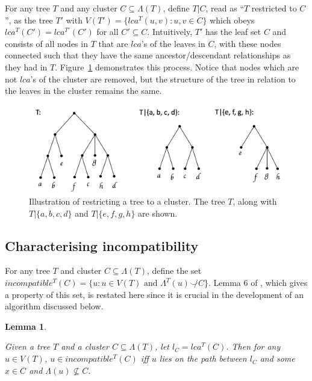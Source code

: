 \documentclass{article}
\newcommand{\compatible}{\smile}
\newcommand{\leafset}{\Lambda}
\newtheorem{incompatibility}{Lemma}
\begin{document}
    For any tree $T$ and any cluster $C \subseteq \leafset(T)$, define $T|C$, read as ``$T$ restricted to $C$'', as the tree $T'$ with $V(T') = \{lca^T(u, v) : u, v \in C\}$ which obeys $lca^T(C') = lca^{T'}(C')$ for all $C' \subseteq C$. Intuitively, $T'$ has the leaf set $C$ and consists of all nodes in $T$ that are $lca$'s of the leaves in $C$, with these nodes connected such that they have the same ancestor/descendant relationships as they had in $T$. Figure~\ref{fig:restrictedtree} demonstrates this process. Notice that nodes which are not $lca$'s of the cluster are removed, but the structure of the tree in relation to the leaves in the cluster remains the same.

    \begin{figure}[ht]
        \includegraphics[scale=0.5]{restrictedsubtree}
        \centering
        \caption[Restricted Trees]{Illustration of restricting a tree to a cluster. The tree $T$, along with $T|\{a, b, c, d\}$ and $T|\{e, f, g, h\}$ are shown.}
        \label{fig:restrictedtree}
    \end{figure}

    \subsection{Characterising incompatibility}

    For any tree $T$ and cluster $C \subseteq \leafset(T)$, define the set $incompatible^{T}(C) = \{u : u \in V(T) \text{ and } \leafset^{T}(u) \not\compatible C\}$. Lemma 6 of \cite{jansson2018algorithms}, which gives a property of this set, is restated here since it is crucial in the development of an algorithm discussed below.
    \newline

    \begin{incompatibility}
        \label{lem:incompatibility}

        Given a tree $T$ and a cluster $C \subseteq \leafset(T)$, let $l_C = lca^T(C)$. Then for any $u \in V(T)$, $u \in incompatible^{T}(C)$ iff $u$ lies on the path between $l_C$ and some $x \in C$ and $\leafset(u) \not\subseteq C$.
    \end{incompatibility}
\end{document}
